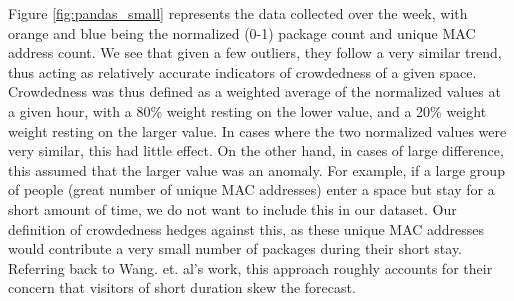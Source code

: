\documentclass[journal, 12pt]{IEEEtran}
\begin{document}
\noindent Figure \ref{fig:pandas_small} represents the data collected over the week, with orange and blue being the normalized (0-1) package count and unique MAC address count. We see that given a few outliers, they follow a very similar trend, thus acting as relatively accurate indicators of crowdedness of a given space. Crowdedness was thus defined as a weighted average of the normalized values at a given hour, with a 80\% weight resting on the lower value, and a 20\% weight weight resting on the larger value. In cases where the two normalized values were very similar, this had little effect. On the other hand, in cases of large difference, this assumed that the larger value was an anomaly. For example, if a large group of people (great number of unique MAC addresses) enter a space but stay for a short amount of time, we do not want to include this in our dataset. Our definition of crowdedness hedges against this, as these unique MAC addresses would contribute a very small number of packages during their short stay. Referring back to Wang. et. al's work, this approach roughly accounts for their concern that visitors of short duration skew the forecast. 


\end{document}
